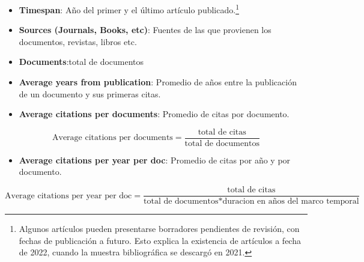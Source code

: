\documentclass[
]{article}
\providecommand{\tightlist}{%
  \setlength{\itemsep}{0pt}\setlength{\parskip}{0pt}}
\begin{document}
\begin{itemize}
\tightlist
\item
  \textbf{Timespan}: Año del primer y el último artículo
  publicado.\footnote{Algunos artículos pueden presentarse borradores
    pendientes de revisión, con fechas de publicación a futuro. Esto
    explica la existencia de artículos a fecha de 2022, cuando la
    muestra bibliográfica se descargó en 2021.}
\end{itemize}

\begin{itemize}
\tightlist
\item
  \textbf{Sources (Journals, Books, etc)}: Fuentes de las que provienen
  los documentos, revistas, libros etc.
\item
  \textbf{Documents}:total de documentos\\
\item
  \textbf{Average years from publication}: Promedio de años entre la
  publicación de un documento y sus primeras citas.\\
\item
  \textbf{Average citations per documents}: Promedio de citas por
  documento.
\end{itemize}

\[
\text{Average citations per documents}=\frac{\text{total de citas}}{\text{total de documentos}}
\]

\begin{itemize}
\tightlist
\item
  \textbf{Average citations per year per doc}: Promedio de citas por año
  y por documento.
\end{itemize}

\[
\text{Average citations per year per doc}=\frac{\text{total de citas}}{\text{total de documentos}*\text{duracion en años del marco temporal}}
\]
\end{document}
